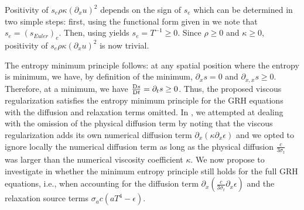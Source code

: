 \documentclass[times]{fldauth}
\begin{document}
Positivity of $s_e \rho \kappa (\partial_x u)^2$ depends on the sign of $s_e$ which can be determined in two simple 
steps: first, using the functional form given in  we note that $s_e = (s_{Euler})_e$. Then, using 
 yields $s_e = T^{-1} \geq 0$. Since $\rho \geq 0$ and $\kappa \geq 0$, positivity of 
$s_e \rho \kappa (\partial_x u)^2$ is now trivial.

 
The entropy minimum principle follows: at any spatial position where the entropy is minimum, we have, by definition of 
the minimum, $\partial_x s =0$ and $\partial_{x,x} s \geq 0$. Therefore, at a minimum, we have 
$\frac{\textrm{D} s}{\textrm{D} t}=\partial_t s \geq 0$. Thus, the proposed viscous regularization satisfies the entropy minimum principle for 
the GRH equations with the diffusion and relaxation terms omitted. In \cite{our_jcp_radhy_paper}, we attempted at 
dealing with the omission of the physical diffusion term by noting that the 
viscous regularization adds its own numerical diffusion term $\partial_x \left( \kappa \partial_x \epsilon \right)$ and 
we opted to ignore locally the numerical diffusion term as long as the physical diffusion $\frac{c}{3 \sigma_t}$ was 
larger than the numerical viscosity coefficient $\kappa$. 
%
We now propose to investigate in  whether the minimum entropy principle still holds for the full 
GRH equations, i.e., when accounting for the diffusion term
$\partial_x \left( \frac{c}{3 \sigma_t} \partial_x \epsilon \right)$ and the relaxation source terms
$\sigma_a c \left( a T^4 - \epsilon \right)$.
%
\end{document}
